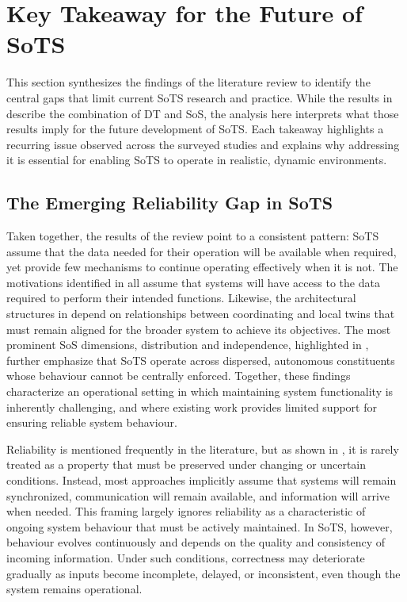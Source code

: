 \section{Key Takeaway for the Future of SoTS}\label{sec:literature-review-key-takeaways}
This section synthesizes the findings of the literature review to identify the central gaps that limit current SoTS research and practice. While the results in  describe the combination of DT and SoS, the analysis here interprets what those results imply for the future development of SoTS. Each takeaway highlights a recurring issue observed across the surveyed studies and explains why addressing it is essential for enabling SoTS to operate in realistic, dynamic environments.


\subsection*{The Emerging Reliability Gap in SoTS}

Taken together, the results of the review point to a consistent pattern: SoTS assume that the data needed for their operation will be available when required, yet provide few mechanisms to continue operating effectively when it is not. The motivations identified in  all assume that systems will have access to the data required to perform their intended functions. Likewise, the architectural structures in  depend on relationships between coordinating and local twins that must remain aligned for the broader system to achieve its objectives. The most prominent SoS dimensions, distribution and independence, highlighted in , further emphasize that SoTS operate across dispersed, autonomous constituents whose behaviour cannot be centrally enforced. Together, these findings characterize an operational setting in which maintaining system functionality is inherently challenging, and where existing work provides limited support for ensuring reliable system behaviour.


Reliability is mentioned frequently in the literature, but as shown in , it is rarely treated as a property that must be preserved under changing or uncertain conditions. Instead, most approaches implicitly assume that systems will remain synchronized, communication will remain available, and information will arrive when needed. This framing largely ignores reliability as a characteristic of ongoing system behaviour that must be actively maintained. In SoTS, however, behaviour evolves continuously and depends on the quality and consistency of incoming information. Under such conditions, correctness may deteriorate gradually as inputs become incomplete, delayed, or inconsistent, even though the system remains operational.


